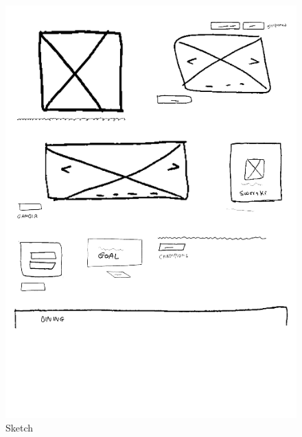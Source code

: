 \documentclass{ioereport}
\begin{document}
\begin{figure}[H]
\begin{minipage}{0.35\textwidth}
        \includegraphics[width=\linewidth]{images/sample1-sketch.png}
        \caption{Sketch}
        \label{fig:s2}
    \end{minipage}
\end{figure}
\vspace{1em} 
\end{document}
